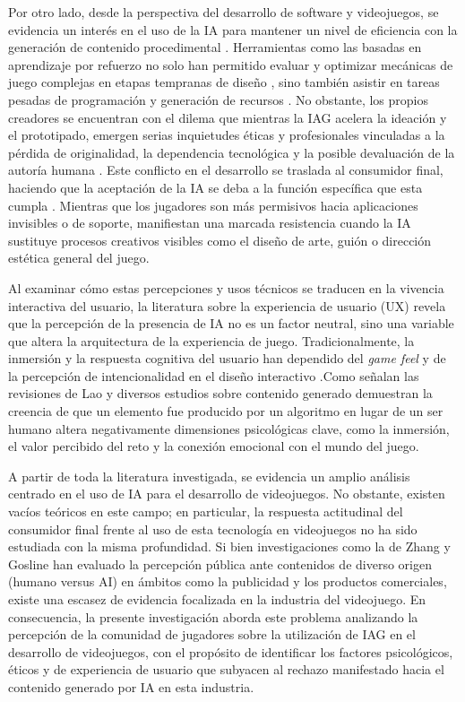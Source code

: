 Por otro lado, desde la perspectiva del desarrollo de software y videojuegos, se evidencia un interés en el uso de la IA para mantener un nivel de eficiencia con la generación de contenido procedimental \cite{filipovic2023}. Herramientas como las basadas en aprendizaje por refuerzo no solo han permitido evaluar y optimizar mecánicas de juego complejas en etapas tempranas de diseño \cite{gonzalez2023mechanic}, sino también asistir en tareas pesadas de programación y generación de recursos \cite{li2024}. No obstante, los propios creadores se encuentran con el dilema que mientras la IAG acelera la ideación y el prototipado, emergen serias inquietudes éticas y profesionales vinculadas a la pérdida de originalidad, la dependencia tecnológica y la posible devaluación de la autoría humana \cite{alharthi2025}. Este conflicto en el desarrollo se traslada al consumidor final, haciendo que la aceptación de la IA se deba a la función específica que esta cumpla \cite{hsu2026ai}. Mientras que los jugadores son más permisivos hacia aplicaciones invisibles o de soporte, manifiestan una marcada resistencia cuando la IA sustituye procesos creativos visibles como el diseño de arte, guión o dirección estética general del juego.

Al examinar cómo estas percepciones y usos técnicos se traducen en la vivencia interactiva del usuario, la literatura sobre la experiencia de usuario (UX) revela que la percepción de la presencia de IA no es un factor neutral, sino una variable que altera la arquitectura de la experiencia de juego. Tradicionalmente, la inmersión y la respuesta cognitiva del usuario han dependido del \textit{game feel} y de la percepción de intencionalidad en el diseño interactivo \cite{swink2008gamefeel}.Como señalan las revisiones de Lao \cite{lao2025} y diversos estudios sobre contenido generado \cite{bazzaz2026imitation} demuestran la creencia de que un elemento fue producido por un algoritmo en lugar de un ser humano altera negativamente dimensiones psicológicas clave, como la inmersión, el valor percibido del reto y la conexión emocional con el mundo del juego. 

A partir de toda la literatura investigada, se evidencia un amplio análisis centrado en el uso de IA para el desarrollo de videojuegos. No obstante, existen vacíos teóricos en este campo; en particular, la respuesta actitudinal del consumidor final frente al uso de esta tecnología en videojuegos no ha sido estudiada con la misma profundidad. Si bien investigaciones como la de Zhang y Gosline \cite{zhang2023aicreated} han evaluado la percepción pública ante contenidos de diverso origen (humano versus AI) en ámbitos como la publicidad y los productos comerciales, existe una escasez de evidencia focalizada en la industria del videojuego. En consecuencia, la presente investigación aborda este problema analizando la percepción de la comunidad de jugadores sobre la utilización de IAG en el desarrollo de videojuegos, con el propósito de identificar los factores psicológicos, éticos y de experiencia de usuario que subyacen al rechazo manifestado hacia el contenido generado por IA en esta industria.